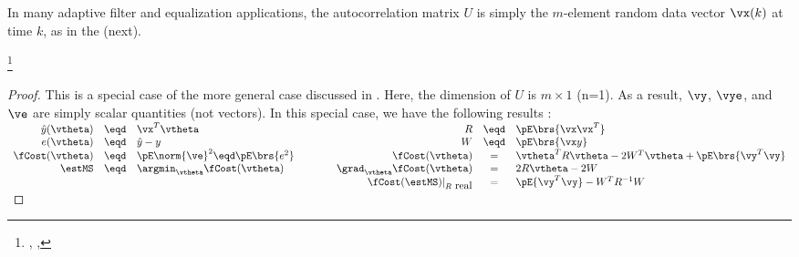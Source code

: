 In many adaptive filter and equalization applications,
the autocorrelation matrix $U$ is simply the $m$-element
random data vector $\vx(k)$ at time $k$, as in the  (next).
\begin{corollary}
\footnote{
  ,
  ,
  }
\end{corollary}
\begin{proof}
This is a special case of the more general case discussed
in .
Here, the dimension of $U$ is $m\times1$ (n=1).
As a result,
$\vy$, $\vye$, and $\ve$ are simply scalar quantities (not vectors).
In this special case, we have the following results
:
\\\indentx$\begin{array}{rcl@{\qquad\qquad}rcl}
      \hat{y}(\vtheta) &\eqd& \vx^T \vtheta                    & R                               &\eqd& \pE\brs{\vx\vx^T}                                    
    \\ e(\vtheta)      &\eqd& \hat{y}-y                        & W                               &\eqd& \pE\brs{ \vx y }                                     
    \\ \fCost(\vtheta) &\eqd& \pE\norm{\ve}^2 \eqd \pE\brs{e^2} & \fCost(\vtheta)                 &=&    \vtheta^T R \vtheta -2W^T\vtheta  + \pE\brs{\vy^T\vy}
    \\ \estMS          &\eqd& \argmin_\vtheta \fCost(\vtheta)  & \grad_\vtheta \fCost(\vtheta)   &=&     2R\vtheta - 2W                                      
    \\                 &    &                                  & \fCost(\estMS)|_{R\mbox{ real}} &=&     \pE{\vy^T\vy} - W^T R^{-1}W                         
\end{array}$
\end{proof}


